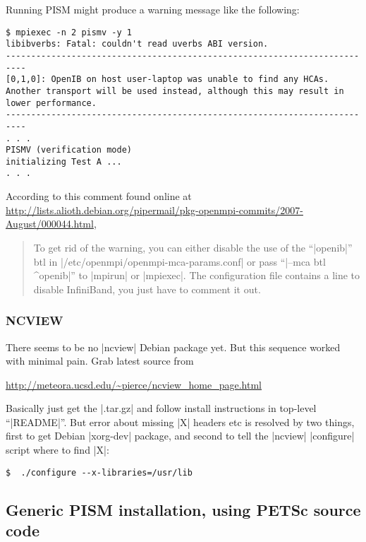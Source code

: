 \documentclass[11pt,final]{amsart}
\begin{document}
Running PISM might produce a warning message like the following:
\begin{verbatim}
$ mpiexec -n 2 pismv -y 1
libibverbs: Fatal: couldn't read uverbs ABI version.
--------------------------------------------------------------------------
[0,1,0]: OpenIB on host user-laptop was unable to find any HCAs.
Another transport will be used instead, although this may result in 
lower performance.
--------------------------------------------------------------------------
. . .
PISMV (verification mode)
initializing Test A ...
. . .
\end{verbatim}
According to this comment found online at \url{http://lists.alioth.debian.org/pipermail/pkg-openmpi-commits/2007-August/000044.html},
\begin{quote}
   To get rid of the warning, you can either disable the use of the ``|openib|'' btl
   in |/etc/openmpi/openmpi-mca-params.conf| or pass ``|--mca btl ^openib|'' to |mpirun|
   or |mpiexec|.  The configuration file contains a line to disable InfiniBand, you
   just have to comment it out.
\end{quote}
\bigskip

\subsubsection*{NCVIEW}  There seems to be no |ncview| Debian package
yet.  But this sequence worked with minimal pain.  Grab latest source from
\begin{center}
  \url{http://meteora.ucsd.edu/~pierce/ncview_home_page.html}
\end{center}
Basically just get the |.tar.gz| and follow install instructions in top-level ``|README|''.  But error about missing |X| headers etc is resolved by two things, first to get Debian |xorg-dev| package, and second to tell the |ncview| |configure| script where to find |X|:
\begin{verbatim}
$  ./configure --x-libraries=/usr/lib
\end{verbatim}

\clearpage
\subsection{Generic PISM installation, using PETSc source code}\label{subsec:generic}
\end{document}
